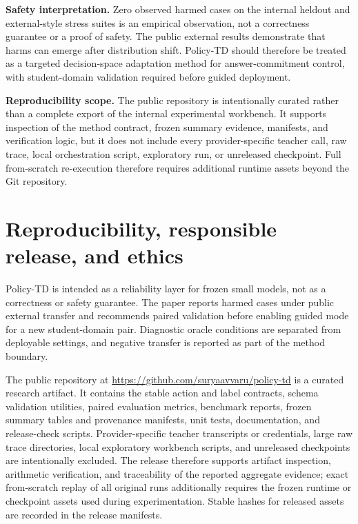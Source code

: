 \documentclass[11pt]{article}
\newcommand{\policytd}{Policy-TD}
\begin{document}
\textbf{Safety interpretation.} Zero observed harmed cases on the internal heldout and external-style stress suites is an empirical observation, not a correctness guarantee or a proof of safety. The public external results demonstrate that harms can emerge after distribution shift. \policytd{} should therefore be treated as a targeted decision-space adaptation method for answer-commitment control, with student-domain validation required before guided deployment.


\textbf{Reproducibility scope.} The public repository is intentionally curated rather than a complete export of the internal experimental workbench. It supports inspection of the method contract, frozen summary evidence, manifests, and verification logic, but it does not include every provider-specific teacher call, raw trace, local orchestration script, exploratory run, or unreleased checkpoint. Full from-scratch re-execution therefore requires additional runtime assets beyond the Git repository.
\section{Reproducibility, responsible release, and ethics}
\policytd{} is intended as a reliability layer for frozen small models, not as a correctness or safety guarantee. The paper reports harmed cases under public external transfer and recommends paired validation before enabling guided mode for a new student-domain pair. Diagnostic oracle conditions are separated from deployable settings, and negative transfer is reported as part of the method boundary.

The public repository at \url{https://github.com/suryaavvaru/policy-td} is a curated research artifact. It contains the stable action and label contracts, schema validation utilities, paired evaluation metrics, benchmark reports, frozen summary tables and provenance manifests, unit tests, documentation, and release-check scripts. Provider-specific teacher transcripts or credentials, large raw trace directories, local exploratory workbench scripts, and unreleased checkpoints are intentionally excluded. The release therefore supports artifact inspection, arithmetic verification, and traceability of the reported aggregate evidence; exact from-scratch replay of all original runs additionally requires the frozen runtime or checkpoint assets used during experimentation. Stable hashes for released assets are recorded in the release manifests.
\end{document}
